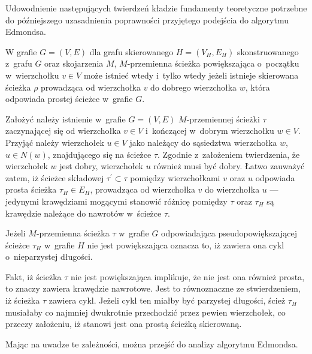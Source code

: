 {  Udowodnienie następujących twierdzeń kładzie fundamenty teoretyczne potrzebne do późniejszego uzasadnienia poprawności przyjętego podejścia do algorytmu Edmondsa.
  \begin{theorem}
    W grafie $G=(V, E)$ dla grafu skierowanego $H=(V_H,E_H)$ skonstruowanego z~grafu $G$ oraz skojarzenia $M$, $M$-przemienna ścieżka powiększająca o~początku w~wierzchołku $v \in V$ może istnieć wtedy i~tylko wtedy jeżeli istnieje skierowana ścieżka $\rho$ prowadząca od wierzchołka $v$ do dobrego wierzchołka $w$, która odpowiada prostej ścieżce w~grafie $G$.
  \end{theorem}
  \begin{bproof}
    Założyć należy istnienie w~grafie $G=(V, E)$ $M$-przemiennej ścieżki $\tau$ zaczynającej się od wierzchołka $v \in V$ i~kończącej w~dobrym wierzchołku $w \in V$. Przyjąć należy wierzchołek $u \in V$ jako należący do sąsiedztwa wierzchołka $w$, $u \in N(w)$, znajdującego się na ścieżce $\tau$.
    Zgodnie z~założeniem twierdzenia, że wierzchołek $w$ jest dobry, wierzchołek $u$ również musi być dobry.
    Łatwo zauważyć zatem, iż ścieżce składowej $\tau^\prime \subset \tau$ pomiędzy wierzchołkami $v$ oraz $u$ odpowiada prosta ścieżka $\tau_H \in E_H$, prowadząca od wierzchołka $v$ do wierzchołka $u$ --- jedynymi krawędziami mogącymi stanowić różnicę pomiędzy $\tau$ oraz $\tau_H$ są krawędzie należące do nawrotów w~ścieżce $\tau$.
  \end{bproof}
  \begin{theorem}
    Jeżeli $M$-przemienna ścieżka $\tau$ w~grafie $G$ odpowiadająca pseudopowiększającej ścieżce $\tau_H$ w~grafie $H$ nie jest powiększająca oznacza to, iż zawiera ona cykl o~nieparzystej długości.
  \end{theorem}
  \begin{bproof}
    Fakt, iż ścieżka $\tau$ nie jest powiększająca implikuje, że nie jest ona również prosta, to znaczy zawiera krawędzie nawrotowe.
    Jest to równoznaczne ze stwierdzeniem, iż ścieżka $\tau$ zawiera cykl.
    Jeżeli cykl ten miałby być parzystej długości, ścież $\tau_H$ musiałaby co najmniej dwukrotnie przechodzić przez pewien wierzchołek, co przeczy założeniu, iż stanowi jest ona prostą ścieżką skierowaną.
  \end{bproof}
  Mając na uwadze te zależności, można przejść do analizy algorytmu Edmondsa.
}
